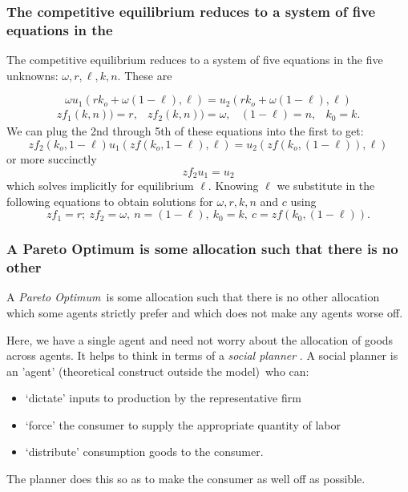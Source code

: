 \documentclass[aspectratio=169]{ltx-talk}
\begin{document}
\begin{frame}
\frametitle{The competitive equilibrium reduces to a system of five equations in the}
The competitive equilibrium reduces to a system of five equations in the
five unknowns: $\omega ,r,\ell ,k,n.$ These are

\begin{equation*}
\omega u_{1}(rk_{o}+\omega \left( 1-\ell \right) ,\ell )=u_{2}(rk_{o}+\omega
\left( 1-\ell \right) ,\ell )
\end{equation*}%
\begin{equation*}
\begin{array}{llll}
zf_{1}\left( k,n\right) )=r, & zf_{2}\left( k,n\right) )=\omega , & (1-\ell
)=n, & k_{0}=k.%
\end{array}%
\end{equation*}%
We can plug the 2nd through 5th of these equations into the first to get: 
\begin{equation*}
zf_{2}\left( k_{o},1-\ell \right) u_{1}(zf\left( k_{o},1-\ell \right) ,\ell
)=u_{2}(zf\left( k_{o},\left( 1-\ell \right) \right) ,\ell )
\end{equation*}%
or more succinctly%
\begin{equation*}
zf_{2}u_{1}=u_{2}
\end{equation*}%
which solves implicitly for equilibrium $\ell $. Knowing $\ell $ we
substitute in the following equations to obtain solutions for $\omega ,r,k,n$
and $c$ using%
\begin{equation*}
zf_{1}=r;~zf_{2}=\omega ,~n=(1-\ell ),~k_{0}=k,~c=zf\left( k_{0},(1-\ell
)\right) .
\end{equation*}
\end{frame}

\begin{frame}
\frametitle{A Pareto Optimum is some allocation such that there is no other}
A \textit{Pareto Optimum}\ is some allocation such that there is no other
allocation which some agents strictly prefer and which does not make any
agents worse off.
\par{}


Here, we have a single agent and need not worry about the allocation of
goods across agents. It helps to think in terms of a \textit{social planner}%
. A social planner is an 'agent' (theoretical construct outside the model)\
who can:

\begin{itemize}
\item `dictate' inputs to production by the representative firm

\item `force' the consumer to supply the appropriate quantity of labor

\item `distribute' consumption goods to the consumer.
\end{itemize}

The planner does this so as to make the consumer as well off as possible.
\end{frame}
\end{document}
